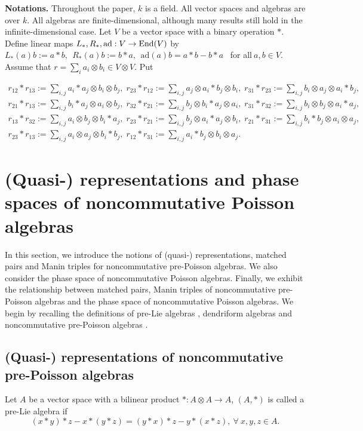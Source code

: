 \documentclass[12pt]{amsart}
\theoremstyle{definition}
\begin{document}
 {\bf Notations.} Throughout the paper, $k$ is a field.  All vector spaces and algebras are over $k$. 
 All algebras are finite-dimensional, although many results still hold in the infinite-dimensional case.
 Let $V$ be a vector space with a binary operation $\ast$. Define linear maps
$L_{\ast}, R_{\ast},\mathrm{ad}:V\rightarrow \hbox{End}(V)$ by
 $L_{\ast}(a)b:=a\ast b, \  \ R_{\ast}(a)b:=b\ast a, \ \ \mathrm{ad}(a)b=a\ast b-b\ast a$~ for all$~a, b\in V$.
Assume that
 $r=\sum\limits_{i}a_i\otimes b_i \in V\otimes V$. Put
 \begin{small}
\begin{align*}
r_{12}\ast r_{13}:=\sum_{i,j}a_i\ast a_j\otimes b_i\otimes b_j,\;r_{23}\ast r_{12}:=\sum_{i,j}a_j\otimes a_i\ast b_j\otimes b_i,\;
r_{31}\ast r_{23}:=\sum_{i,j}b_i\otimes a_j\otimes a_i\ast b_j,\\
r_{21}\ast r_{13}:=\sum_{i,j}b_i\ast a_j\otimes a_i\otimes b_j,\;
r_{32}\ast r_{21}:=\sum_{i,j}b_j\otimes b_i\ast a_j\otimes a_i,\;
r_{31}\ast r_{32}:=\sum_{i,j}b_i\otimes b_j\otimes a_i\ast a_j,\\
r_{13}\ast r_{32}:=\sum_{i,j}a_i\otimes b_j\otimes b_i\ast a_j,\;
r_{23}\ast r_{21}:=\sum_{i,j}b_j\otimes a_i\ast a_j\otimes b_i,\;
r_{21}\ast r_{31}:=\sum_{i,j}b_i\ast b_j\otimes a_i\otimes a_j,\\
r_{23}\ast r_{13}:=\sum_{i,j}a_i \otimes a_j \otimes b_i\ast b_j,\;
r_{12}\ast r_{31}:=\sum_{i,j}a_i\ast b_j\otimes b_i\otimes a_j.
\end{align*}\end{small}


\section{(Quasi-) representations and phase spaces of noncommutative Poisson algebras}
In this section, we introduce the notions of (quasi-) representations, matched pairs
 and Manin triples for noncommutative pre-Poisson algebras. 
 We also consider the phase space of noncommutative Poisson algebras.
  Finally, we exhibit the relationship between matched pairs,
   Manin triples of noncommutative pre-Poisson algebras and the phase space of noncommutative Poisson algebras.
We begin by recalling the definitions of pre-Lie algebras \cite{B3}, 
dendriform algebras \cite{Lo2} and noncommutative pre-Poisson algebras \cite{Lbs}.

\subsection{(Quasi-) representations of noncommutative pre-Poisson algebras}
Let $A$ be a vector space with a bilinear product $\ast:A\otimes
A\longrightarrow A$, $(A,\ast )$ is called a pre-Lie algebra if
\begin{equation*}(x\ast y)\ast z-x\ast(y\ast z)=(y\ast x)\ast z-y\ast(x\ast
z),~\forall~x, y, z \in A.\end{equation*}
\end{document}
